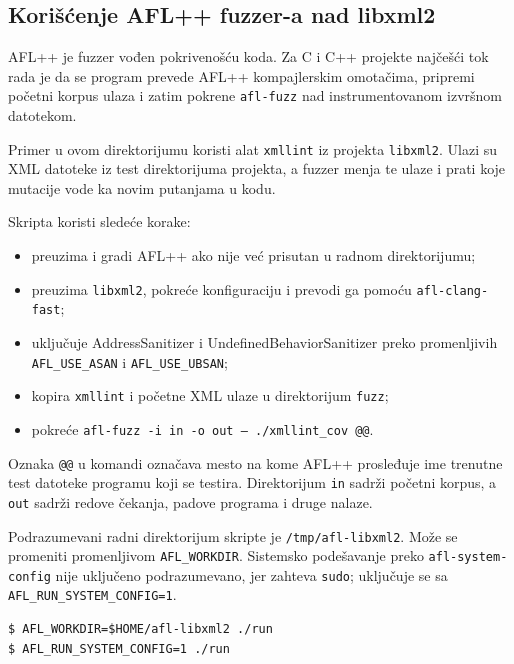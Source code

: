 \subsection{Korišćenje AFL++ fuzzer-a nad libxml2}\label{afl-fuzzer-libxml2}

AFL++ je fuzzer vođen pokrivenošću koda. Za C i C++ projekte najčešći tok rada je da se program prevede AFL++ kompajlerskim omotačima, pripremi početni korpus ulaza i zatim pokrene \texttt{afl-fuzz} nad instrumentovanom izvršnom datotekom.

Primer u ovom direktorijumu koristi alat \texttt{xmllint} iz projekta \texttt{libxml2}. Ulazi su XML datoteke iz test direktorijuma projekta, a fuzzer menja te ulaze i prati koje mutacije vode ka novim putanjama u kodu.


Skripta koristi sledeće korake:

\begin{itemize}
\tightlist
\item
  preuzima i gradi AFL++ ako nije već prisutan u radnom direktorijumu;
\item
  preuzima \texttt{libxml2}, pokreće konfiguraciju i prevodi ga pomoću \texttt{afl-clang-fast};
\item
  uključuje AddressSanitizer i UndefinedBehaviorSanitizer preko promenljivih \texttt{AFL\_USE\_ASAN} i \texttt{AFL\_USE\_UBSAN};
\item
  kopira \texttt{xmllint} i početne XML ulaze u direktorijum \texttt{fuzz};
\item
  pokreće \texttt{afl-fuzz -i in -o out -- ./xmllint\_cov @@}.
\end{itemize}

Oznaka \texttt{@@} u komandi označava mesto na kome AFL++ prosleđuje ime trenutne test datoteke programu koji se testira. Direktorijum \texttt{in} sadrži početni korpus, a \texttt{out} sadrži redove čekanja, padove programa i druge nalaze.

Podrazumevani radni direktorijum skripte je \texttt{/tmp/afl-libxml2}. Može se promeniti promenljivom \texttt{AFL\_WORKDIR}. Sistemsko podešavanje preko \texttt{afl-system-config} nije uključeno podrazumevano, jer zahteva \texttt{sudo}; uključuje se sa \texttt{AFL\_RUN\_SYSTEM\_CONFIG=1}.

\begin{verbatim}
$ AFL_WORKDIR=$HOME/afl-libxml2 ./run
$ AFL_RUN_SYSTEM_CONFIG=1 ./run
\end{verbatim}

